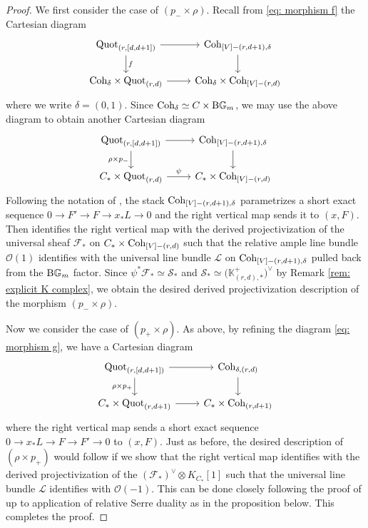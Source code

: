 \documentclass[10pt]{amsart}
\newcommand{\BK}{\mathbb{K}}
\newcommand{\CO}{\mathcal{O}}
\newcommand{\CS}{\mathcal{S}}
\newcommand{\CL}{\mathcal{L}}
\newcommand{\CF}{\mathcal{F}}
\newcommand{\BGm}{\textnormal{B}\mathbb{G}_m}
\newcommand{\Quot}{\textnormal{Quot}}
\newcommand{\Coh}{\textnormal{Coh}}
\newcommand{\+}{{}^+}
\theoremstyle{definition}
\theoremstyle {definition}
\theoremstyle {definition}
\begin{document}
\begin{proof}

We first consider the case of $(p_-\times \rho)$. Recall from \eqref{eq: morphism f} the Cartesian diagram
\begin{equation*}
    \begin{tikzcd}
\Quot_{(r,[d,d+1])} \arrow[r] \arrow[d, "f"] & \Coh_{[V]-(r,d+1), \delta} \arrow[d] \\
\Coh_\delta\times \Quot_{(r,d)} \arrow[r]                 & \Coh_\delta\times \Coh_{[V]-(r,d)}     
\end{tikzcd}
\end{equation*}
where we write $\delta=(0,1)$. Since $\Coh_\delta\simeq C\times \BGm$, we may use the above diagram to obtain another Cartesian diagram 
\begin{equation*}
    \begin{tikzcd}
\Quot_{(r,[d,d+1])} \arrow[r] \arrow[d, "\rho\times p_-"'] & \Coh_{[V]-(r,d+1), \delta} \arrow[d] \\
C_*\times \Quot_{(r,d)} \arrow[r, "\psi"]                 & C_*\times \Coh_{[V]-(r,d)}     
\end{tikzcd}
\end{equation*}
Following the notation of \cite[Sec. 8.1]{Jiang}, the stack $\Coh_{[V]-(r,d+1), \delta}$ parametrizes a short exact sequence $0\rightarrow F'\rightarrow F\rightarrow x_*L\rightarrow 0$ and the right vertical map sends it to $(x,F)$. Then \cite[Prop. 8.5]{Jiang} identifies the right vertical map with the derived projectivization of the universal sheaf $\CF_*$ on $C_*\times \Coh_{[V]-(r,d)}$ such that the relative ample line bundle $\CO(1)$ identifies with the universal line bundle $\CL$ on $\Coh_{[V]-(r,d+1), \delta}$ pulled back from the $\BGm$ factor. Since $\psi^*\CF_*\simeq \CS_*$ and $\CS_*\simeq \big(\BK^+_{(r,d),*}\big)^\vee$ by Remark \ref{rem: explicit K complex}, we obtain the desired derived projectivization description of the morphism $(p_-\times \rho)$. 

Now we consider the case of $(p_+\times \rho)$. As above, by refining the diagram \eqref{eq: morphism g}, we have a Cartesian diagram 
\begin{equation*}
    \begin{tikzcd}
\Quot_{(r,[d,d+1])} \arrow[r] \arrow[d, "\rho\times p_+"'] & \Coh_{\delta,(r,d)} \arrow[d] \\
C_*\times \Quot_{(r,d+1)} \arrow[r]                 & C_*\times \Coh_{(r,d+1)}       
\end{tikzcd}
\end{equation*}
where the right vertical map sends a short exact sequence $0\rightarrow x_*L\rightarrow F\rightarrow F'\rightarrow 0$ to $(x,F)$. Just as before, the desired description of $(\rho\times p_+)$ would follow if we show that the right vertical map identifies with the derived projectivization of the $(\CF_*)^\vee\otimes K_{C_*}[1]$ such that the universal line bundle $\CL$ identifies with $\CO(-1)$. This can be done closely following the proof of \cite[Prop. 8.5]{Jiang} up to application of relative Serre duality as in the proposition below. This completes the proof.

\end{proof}
\end{document}
